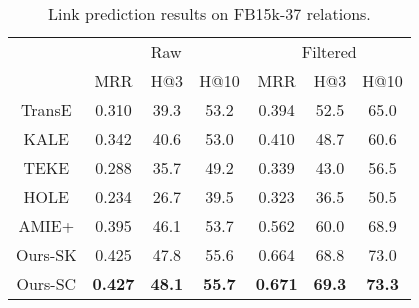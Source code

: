 \begin{table}[tbh]
	\small
	\centering
	\caption{Link prediction results on FB15k-37 relations.}
	\label{tab:link-pred-fb15k}
	\begin{tabular}{|c|ccc|ccc|}
		\hline
				&	\multicolumn{3}{c|}{Raw}
				&	\multicolumn{3}{c|}{Filtered}	\\
		\cline{2-7}	
				&	MRR	&	H@3	&	H@10
				&	MRR	&	H@3	&	H@10	\\
		\hline
		TransE
				&	0.310			&	39.3	&	53.2
				&	0.394	&	52.5	&	65.0	\\	%
		KALE
				&	0.342	&	40.6	&	53.0
				&	0.410	&	48.7	&	60.6	\\	%
		TEKE
				&	0.288	&	35.7	&	49.2
				&	0.339	&	43.0	&	56.5	\\
		HOLE
				&	0.234	&	26.7	&	39.5
				&	0.323	& 	36.5	&	50.5	\\	%
		AMIE+
				&	0.395	&	46.1	&	53.7
				&	0.562	&	60.0	&	68.9	\\
		\hline
		Ours-SK
				&	0.425	&	47.8	&	55.6
				&	0.664	&	68.8	&	73.0	\\		%
		Ours-SC
				&	\textbf{0.427}		&	\textbf{48.1}	&	\textbf{55.7}
				&	\textbf{0.671}		&	\textbf{69.3}	&	\textbf{73.3}	\\		%
		\hline
	\end{tabular}
\end{table}

